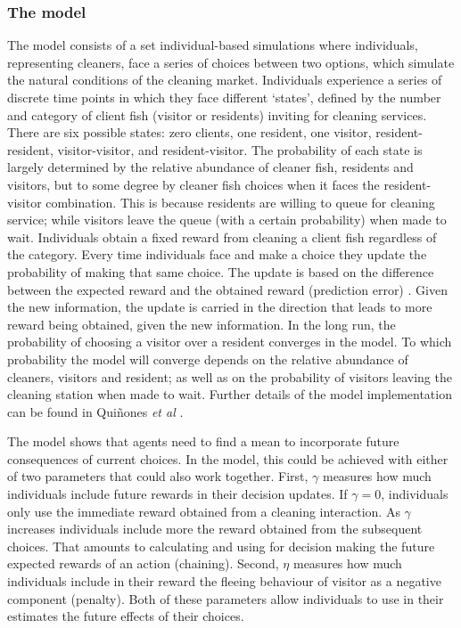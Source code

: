 \documentclass[]{rsos}%
\begin{document}
\hypertarget{the-model}{%
\subsubsection{The model}\label{the-model}}

The model consists of a set individual-based simulations where
individuals, representing cleaners, face a series of choices
between two options, which simulate the natural conditions
of the cleaning market. Individuals experience a series
of discrete time points in which they face different `states',
defined by the number and category of client fish (visitor or residents)
inviting for cleaning services. There are six possible states:
zero clients, one resident, one visitor,
resident-resident, visitor-visitor, and resident-visitor.
The probability of each state is largely determined by the relative
abundance of cleaner fish, residents and visitors, but to some degree by
cleaner fish choices when it faces the resident-visitor combination.
This is because residents are willing to queue for cleaning service;
while visitors leave the queue (with a certain probability) when made to wait.
Individuals obtain a fixed reward from cleaning a client fish
regardless of the category. Every time individuals face and make a choice
they update the probability of making that same choice. The update is
based on the difference between the expected reward and the obtained
reward (prediction error) \citep{sutton_Reinforcement_2018, rescorla_Theory_1972}. Given the new information, the update is carried
in the direction that leads to more reward being obtained, given
the new information. In the long run, the probability of choosing a visitor
over a resident converges in the model. To which probability the model
will converge depends on the relative abundance of cleaners, visitors
and resident; as well as on the probability of visitors leaving the
cleaning station when made to wait. Further details of the model
implementation can be found in Quiñones \emph{et al} \citep{quinones_Reinforcement_2019}.

The model shows that agents need to find a mean
to incorporate future consequences of current choices. In the model,
this could be achieved with either of two parameters that could
also work together. First, \(\gamma\) measures how
much individuals include future rewards in their decision updates.
If \(\gamma=0\), individuals only use the immediate reward obtained from a
cleaning interaction. As \(\gamma\) increases individuals include more the
reward obtained from the subsequent choices. That amounts to calculating
and using for decision making the future expected rewards of an action (chaining).
Second, \(\eta\) measures how much individuals include in their reward the
fleeing behaviour of visitor as a negative component (penalty). Both of
these parameters allow individuals to use in their estimates the future
effects of their choices.
\end{document}
